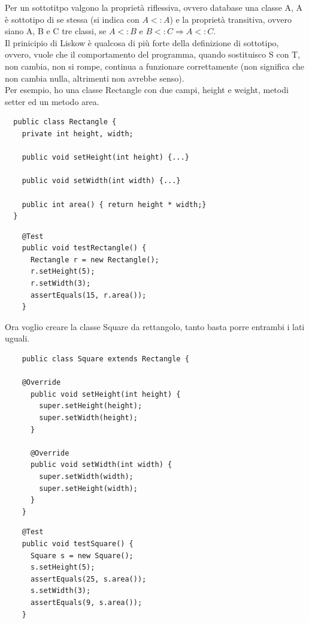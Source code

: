 Per un sottotitpo valgono la proprietà riflessiva, ovvero database una classe A, A è sottotipo di se stessa (si indica con $A<:A$) e la proprietà transitiva, ovvero siano A, B e C tre classi, se $A<:B$ e $B<:C\Rightarrow A<:C$.\\
Il prinicipio di Liskow è qualcosa di più forte della definizione di sottotipo, ovvero, vuole che il comportamento del programma, quando sostituisco S con T, non cambia, non si rompe, continua a funzionare correttamente (non significa che non cambia nulla, altrimenti non avrebbe senso).\\
Per esempio, ho una classe Rectangle con due campi, height e weight, metodi setter ed un metodo area.
\begin{multicols}{2}
  \begin{lstlisting}
  public class Rectangle {
    private int height, width;
    
    public void setHeight(int height) {...}

    public void setWidth(int width) {...}

    public int area() { return height * width;}
  }
  \end{lstlisting}
  \columnbreak
  \begin{lstlisting}
    @Test
    public void testRectangle() {
      Rectangle r = new Rectangle();
      r.setHeight(5);
      r.setWidth(3);
      assertEquals(15, r.area());
    }
  \end{lstlisting}
\end{multicols}

Ora voglio creare la classe Square da rettangolo, tanto basta porre entrambi i lati uguali.\\
\begin{multicols}{2}
  \begin{lstlisting}
    public class Square extends Rectangle {
      
    @Override
      public void setHeight(int height) {
        super.setHeight(height);
        super.setWidth(height);
      }

      @Override
      public void setWidth(int width) {
        super.setWidth(width);
        super.setHeight(width);
      }
    }
  \end{lstlisting}
  \columnbreak
  \begin{lstlisting}
    @Test
    public void testSquare() {
      Square s = new Square();
      s.setHeight(5);
      assertEquals(25, s.area());
      s.setWidth(3);
      assertEquals(9, s.area());
    }
  \end{lstlisting}
\end{multicols}  

